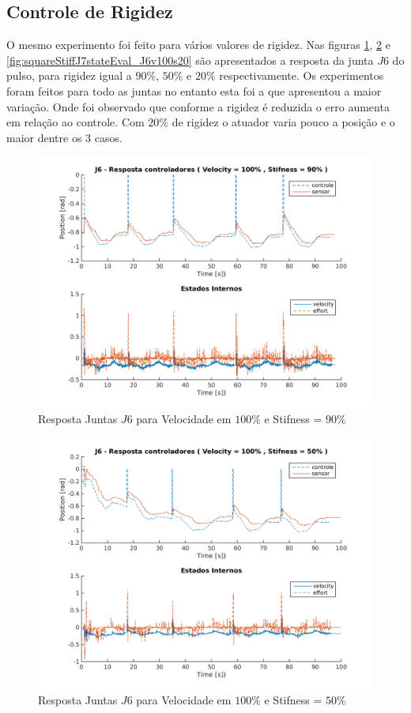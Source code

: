 \subsection{Controle de Rigidez}

O mesmo experimento foi feito para vários valores de rigidez. Nas figuras \ref{fig:squareStiffJ10stateEval_J6v100s90}, \ref{fig:squareStiffJ6stateEval_J6v100s50} e \ref{fig:squareStiffJ7stateEval_J6v100s20} são apresentados a resposta da junta $J6$ do pulso, para rigidez igual a $90\%$, $50\%$ e $20\%$ respectivamente. Os experimentos foram feitos para todo as juntas no entanto esta foi a que apresentou a maior variação. Onde foi observado que conforme a rigidez é reduzida o erro aumenta em relação ao controle. Com $20\%$ de rigidez o atuador varia pouco a posição e o maior dentre os 3 casos.

\vspace{1cm}

\begin{figure}[H]
    \centering
    \includegraphics[width=0.6\linewidth,trim={2cm 1cm 2cm 2cm}]{tex/figs/squareStiffJ10stateEval_J6v100s90.png}
    \caption{Resposta Juntas $J6$ para Velocidade em $100\%$ e Stifness = $90\%$ }
    \label{fig:squareStiffJ10stateEval_J6v100s90}
\end{figure}

\vspace{1cm}

\begin{figure}[H]
    \centering
    \includegraphics[width=0.6\linewidth,trim={2cm 1cm 2cm 2cm}]{tex/figs/squareStiffJ6stateEval_J6v100s50.png}
    \caption{Resposta Juntas $J6$ para Velocidade em $100\%$ e Stifness = $50\%$ }
    \label{fig:squareStiffJ6stateEval_J6v100s50}
\end{figure}

